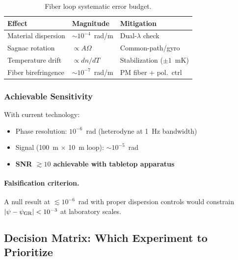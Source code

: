 \begin{table}[h!]
\centering
\caption{Fiber loop systematic error budget.}
\label{tab:fiber-systematics}
\scriptsize
\setlength{\tabcolsep}{2pt}
\begin{tabular}{lll}
\toprule
\textbf{Effect} & \textbf{Magnitude} & \textbf{Mitigation} \\
\midrule
Material dispersion & $\sim 10^{-4}$~rad/m & Dual-$\lambda$ check \\
Sagnac rotation & $\propto A \Omega$ & Common-path/gyro \\
Temperature drift & $\propto dn/dT$ & Stabilization ($\pm 1$~mK) \\
Fiber birefringence & $\sim 10^{-7}$~rad/m & PM fiber + pol.\ ctrl \\
\bottomrule
\end{tabular}
\end{table}

\subsubsection{Achievable Sensitivity}

With current technology:
\begin{itemize}
\item Phase resolution: $10^{-6}$~rad (heterodyne at 1~Hz bandwidth)
\item Signal (100~m $\times$ 10~m loop): $\sim 10^{-5}$~rad
\item \textbf{SNR $\gtrsim 10$ achievable with tabletop apparatus}
\end{itemize}

\paragraph{Falsification criterion.}
A null result at $\lesssim 10^{-6}$~rad with proper dispersion controls would 
constrain $|\psi - \psi_{\rm GR}| < 10^{-3}$ at laboratory scales.

\subsection{Decision Matrix: Which Experiment to Prioritize}\label{app:decision}

